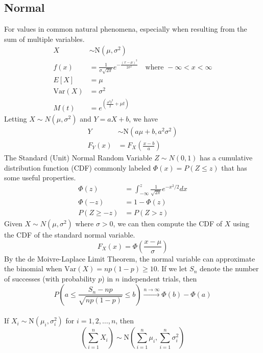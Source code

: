 \documentclass[12pt]{article}
\newcommand{\Sp}{\text{ }}
\newcommand{\Var}{\text{Var}}
\newcommand{\Norm}{\text{N}}
\newcommand{\Where}{\Sp\text{ where }}
\begin{document}
\subsection{Normal}
For values in common natural phenomena, especially when resulting from the sum of multiple variables.
\begin{align*}
    X& \sim \Norm(\mu, \sigma^2) \\
 f(x)& = \frac{1}{\sigma\sqrt{2\pi}} e^{-\frac{(x-\mu)^2}{2\sigma^2}} \Where -\infty < x < \infty \\
 E[X]& = \mu \\
    \Var(X)& = \sigma^2 \\
       M(t)& = e^{\left( \frac{\sigma^2 t^2}{2} + \mu t\right)}
\end{align*}
Letting $X \sim N(\mu, \sigma^2)$ and $Y = aX + b$, we have
\begin{align*}
    Y& \sim \Norm(a\mu + b, a^2\sigma^2) \\
     F_Y(x)& = F_X(\frac{x - b}{a})
\end{align*}
The Standard (Unit) Normal Random Variable $Z \sim N(0, 1)$ has a cumulative distribution function (CDF) commonly labeled $\Phi(x) = P(Z \leq z)$ that has some useful properties.
\begin{align*}
    \Phi(z)& = \int_{-\infty}^{z} \frac{1}{\sqrt{2\pi}} e^{-x^2/2} dx \\
   \Phi(-z)& = 1 - \Phi(z)\\
P(Z \geq -z)& = P(Z > z)
\end{align*}
Given $X \sim N(\mu, \sigma^2)$ where $\sigma > 0$, we can then compute the CDF of $X$ using the CDF of the standard normal variable.
$$F_X(x) = \Phi(\frac{x - \mu}{\sigma})$$
By the de Moivre-Laplace Limit Theorem, the normal variable can approximate the binomial when $\Var(X) = np(1-p) \geq 10$. If we let $S_n$ denote the number of successes (with probability $p$) in $n$ independent trials, then
$$ P \left( a \leq \frac{S_n - np}{\sqrt{np(1-p)}} \leq  b \right) \overset{n \rightarrow \infty}{\rightarrow} \Phi(b) - \Phi(a)$$
\\
If $X_i \sim \Norm(\mu_i, \sigma_i^2)$ for $i = 1, 2, \ldots, n$, then
\[
    \left( \sum_{i=1}^n X_i \right) \sim \Norm\left( \sum_{i=1}^n \mu_i, \sum_{i=1}^n \sigma_i^2 \right)
\]
\end{document}
